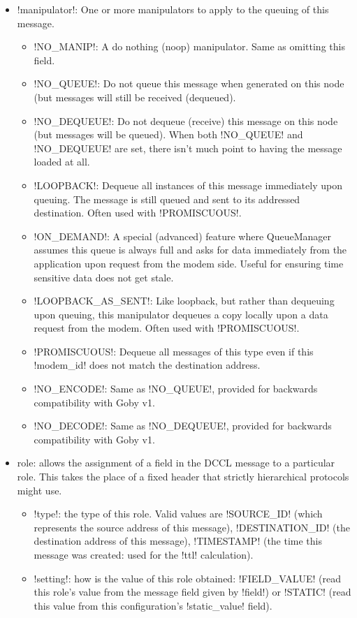 \begin{itemize}
\begin{itemize}
\item !manipulator!: One or more manipulators to apply to the queuing of this message.
\begin{itemize}
\item !NO_MANIP!: A do nothing (noop) manipulator. Same as omitting this field.
\item !NO_QUEUE!: Do not queue this message when generated on this node (but messages will still be received (dequeued).
\item !NO_DEQUEUE!: Do not dequeue (receive) this message on this node (but messages will be queued). When both !NO_QUEUE! and !NO_DEQUEUE! are set, there isn't much point to having the message loaded at all.
\item !LOOPBACK!: Dequeue all instances of this message immediately upon queuing. The message is still queued and sent to its addressed destination. Often used with !PROMISCUOUS!.
\item !ON_DEMAND!: A special (advanced) feature where QueueManager assumes this queue is always full and asks for data immediately from the application upon request from the modem side. Useful for ensuring time sensitive data does not get stale.
\item !LOOPBACK_AS_SENT!: Like loopback, but rather than dequeuing upon queuing, this manipulator dequeues a copy locally upon a data request from the modem. Often used with !PROMISCUOUS!.
\item !PROMISCUOUS!: Dequeue all messages of this type even if this !modem_id! does not match the destination address.
\item !NO_ENCODE!: Same as !NO_QUEUE!, provided for backwards compatibility with Goby v1.
\item !NO_DECODE!: Same as !NO_DEQUEUE!, provided for backwards compatibility with Goby v1.
\end{itemize}
\item role: allows the assignment of a field in the DCCL message to a particular role. This takes the place of a fixed header that strictly hierarchical protocols might use. 
\begin{itemize}
\item !type!: the type of this role. Valid values are !SOURCE_ID! (which represents the source address of this message), !DESTINATION_ID! (the destination address of this message), !TIMESTAMP! (the time this message was created: used for the !ttl! calculation).
\item !setting!: how is the value of this role obtained: !FIELD_VALUE! (read this role's value from the message field given by !field!) or !STATIC! (read this value from this configuration's !static_value! field).

\end{itemize}
\end{itemize}
\end{itemize}
